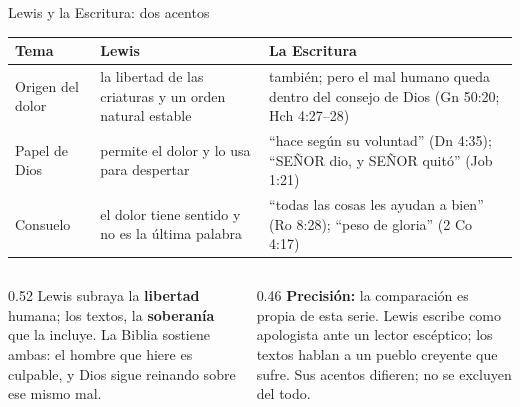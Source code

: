 \documentclass[hyperref={bookmarks=false},aspectratio=169]{beamer}
\newcommand{\SENOR}{S{\fontsize{0.78em}{1em}\selectfont EÑOR}}
\newcommand{\destacar}[1]{\textbf{\textcolor{azul}{#1}}}
\newcommand{\precision}[1]{{\footnotesize\color{gris}\textbf{Precisión:} #1}}
\begin{document}
\begin{frame}{Lewis y la Escritura: dos acentos}
\scriptsize\renewcommand{\arraystretch}{1.2}
\begin{tabular}{@{}>{\RaggedRight\arraybackslash}p{2.6cm}>{\RaggedRight\arraybackslash}p{4.4cm}>{\RaggedRight\arraybackslash}p{4.8cm}@{}}
\toprule
\textbf{Tema} & \textbf{Lewis} & \textbf{La Escritura} \\ \midrule
Origen del dolor & la libertad de las criaturas y un orden natural estable & también; pero el mal humano queda dentro del consejo de Dios (Gn 50:20; Hch 4:27--28) \\
Papel de Dios & permite el dolor y lo usa para despertar & ``hace según su voluntad'' (Dn 4:35); ``\SENOR{} dio, y \SENOR{} quitó'' (Job 1:21) \\
Consuelo & el dolor tiene sentido y no es la última palabra & ``todas las cosas les ayudan a bien'' (Ro 8:28); ``peso de gloria'' (2 Co 4:17) \\
\bottomrule
\end{tabular}\par\medskip
\begin{columns}[t,onlytextwidth]
\begin{column}{0.52\textwidth}\small
Lewis subraya la \destacar{libertad} humana; los textos, la \destacar{soberanía} que la incluye. La Biblia sostiene ambas: el hombre que hiere es culpable, y Dios sigue reinando sobre ese mismo mal.
\end{column}
\begin{column}{0.46\textwidth}
\precision{la comparación es propia de esta serie. Lewis escribe como apologista ante un lector escéptico; los textos hablan a un pueblo creyente que sufre. Sus acentos difieren; no se excluyen del todo.}
\end{column}
\end{columns}
\end{frame}
\end{document}
